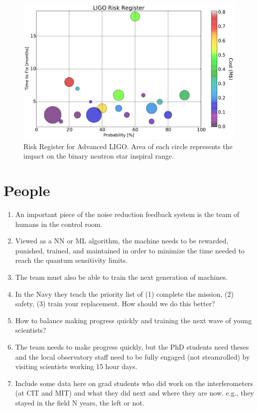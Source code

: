 \begin{figure}[h]
\centering
\includegraphics[width=\columnwidth]{Figures/Risk.pdf}
\caption{Risk Register for Advanced LIGO. Area of each circle represents the impact on the binary neutron star inspiral range.}
\label{fig:RiskBubbles}
\end{figure}


\section{People}
\begin{enumerate}
\item An important piece of the noise reduction feedback system 
  is the team of humans in the control room.
\item Viewed as a NN or ML algorithm, the machine needs to be 
  rewarded, punished, trained, and maintained in order to minimize 
  the time needed to reach the quantum sensitivity limits.
\item The team must also be able to train the next generation of machines.
\item In the Navy they teach the priority list of (1) complete the mission, 
  (2) safety, (3) train your replacement. How should we do this better?
\item How to balance making progress quickly and training the next 
  wave of young scientists?
\item The team needs to make progress quickly, but the PhD 
  students need theses and the local observatory staff need to 
  be fully engaged (not steamrolled) by visiting scientists 
  working 15 hour days.
\item Include some data here on grad students who did work on the
  interferometers (at CIT and MIT) and what they did next and where
  they are now. e.g., they stayed in the field N years, the left or not.
\end{enumerate}

